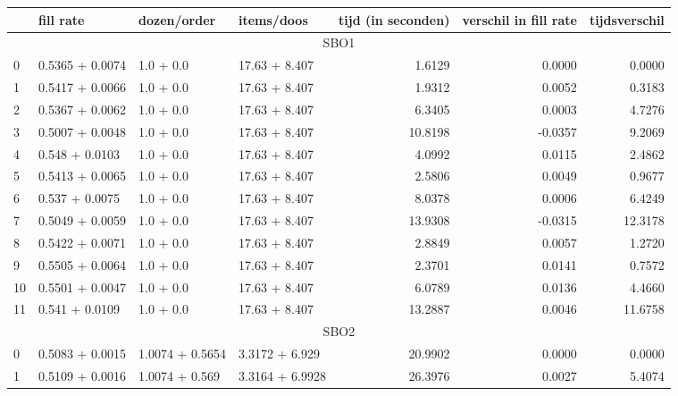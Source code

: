 \begin{tabular}{llllrrr}
  \toprule
  {} &        fill rate &      dozen/order &       items/doos &  tijd (in seconden) &  verschil in fill rate &  tijdsverschil \\
  \midrule
  \multicolumn{7}{c}{SBO1} \\
  \midrule
  0  &  0.5365 + 0.0074 &   1.0 + 0.0 &  17.63 + 8.407 &              1.6129 &                 0.0000 &         0.0000 \\
  1  &  0.5417 + 0.0066 &   1.0 + 0.0 &  17.63 + 8.407 &              1.9312 &                 0.0052 &         0.3183 \\
  2  &  0.5367 + 0.0062 &   1.0 + 0.0 &  17.63 + 8.407 &              6.3405 &                 0.0003 &         4.7276 \\
  3  &  0.5007 + 0.0048 &   1.0 + 0.0 &  17.63 + 8.407 &             10.8198 &                -0.0357 &         9.2069 \\
  4  &   0.548 + 0.0103 &   1.0 + 0.0 &  17.63 + 8.407 &              4.0992 &                 0.0115 &         2.4862 \\
  5  &  0.5413 + 0.0065 &   1.0 + 0.0 &  17.63 + 8.407 &              2.5806 &                 0.0049 &         0.9677 \\
  6  &   0.537 + 0.0075 &   1.0 + 0.0 &  17.63 + 8.407 &              8.0378 &                 0.0006 &         6.4249 \\
  7  &  0.5049 + 0.0059 &   1.0 + 0.0 &  17.63 + 8.407 &             13.9308 &                -0.0315 &        12.3178 \\
  8  &  0.5422 + 0.0071 &   1.0 + 0.0 &  17.63 + 8.407 &              2.8849 &                 0.0057 &         1.2720 \\
  9  &  0.5505 + 0.0064 &   1.0 + 0.0 &  17.63 + 8.407 &              2.3701 &                 0.0141 &         0.7572 \\
  10 &  0.5501 + 0.0047 &   1.0 + 0.0 &  17.63 + 8.407 &              6.0789 &                 0.0136 &         4.4660 \\
  11 &   0.541 + 0.0109 &   1.0 + 0.0 &  17.63 + 8.407 &             13.2887 &                 0.0046 &        11.6758 \\
  \midrule
  \multicolumn{7}{c}{SBO2} \\
  \midrule
  0  &  0.5083 + 0.0015 &  1.0074 + 0.5654 &   3.3172 + 6.929 &             20.9902 &                 0.0000 &         0.0000 \\
  1  &  0.5109 + 0.0016 &   1.0074 + 0.569 &  3.3164 + 6.9928 &             26.3976 &                 0.0027 &         5.4074 \\

\end{tabular}
